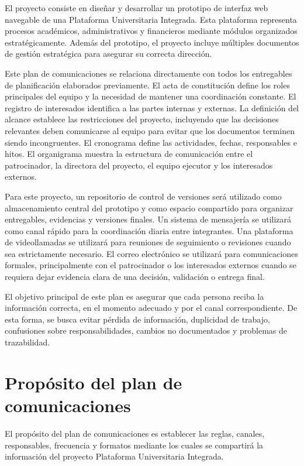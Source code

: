 \documentclass[11pt,spanish]{article}
\begin{document}
El proyecto consiste en diseñar y desarrollar un prototipo de interfaz web navegable de una Plataforma Universitaria Integrada. Esta plataforma representa procesos académicos, administrativos y financieros mediante módulos organizados estratégicamente. Además del prototipo, el proyecto incluye múltiples documentos de gestión estratégica para asegurar su correcta dirección.

Este plan de comunicaciones se relaciona directamente con todos los entregables de planificación elaborados previamente. El acta de constitución define los roles principales del equipo y la necesidad de mantener una coordinación constante. El registro de interesados identifica a las partes internas y externas. La definición del alcance establece las restricciones del proyecto, incluyendo que las decisiones relevantes deben comunicarse al equipo para evitar que los documentos terminen siendo incongruentes. El cronograma define las actividades, fechas, responsables e hitos. El organigrama muestra la estructura de comunicación entre el patrocinador, la directora del proyecto, el equipo ejecutor y los interesados externos.

Para este proyecto, un repositorio de control de versiones será utilizado como almacenamiento central del prototipo y como espacio compartido para organizar entregables, evidencias y versiones finales. Un sistema de mensajería se utilizará como canal rápido para la coordinación diaria entre integrantes. Una plataforma de videollamadas se utilizará para reuniones de seguimiento o revisiones cuando sea estrictamente necesario. El correo electrónico se utilizará para comunicaciones formales, principalmente con el patrocinador o los interesados externos cuando se requiera dejar evidencia clara de una decisión, validación o entrega final.

El objetivo principal de este plan es asegurar que cada persona reciba la información correcta, en el momento adecuado y por el canal correspondiente. De esta forma, se busca evitar pérdida de información, duplicidad de trabajo, confusiones sobre responsabilidades, cambios no documentados y problemas de trazabilidad.

\section{Propósito del plan de comunicaciones}

El propósito del plan de comunicaciones es establecer las reglas, canales, responsables, frecuencia y formatos mediante los cuales se compartirá la información del proyecto Plataforma Universitaria Integrada.
\end{document}
